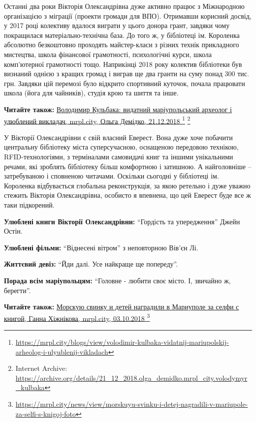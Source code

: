
Останні два роки Вікторія Олександрівна дуже активно працює з Міжнародною
організацією з міграції (проекти громади для ВПО). Отримавши корисний досвід, у
2017 році колективу вдалося виграти у цього донора грант, завдяки чому
покращилася матеріально-технічна база. До того ж, у бібліотеці ім. Короленка
абсолютно безкоштовно проходять майстер-класи з різних технік прикладного
мистецтва, школа фінансової грамотності, психологічні курси, школа комп'ютерної
грамотності тощо. Наприкінці 2018 року колектив бібліотеки був визнаний однією
з кращих громад і виграв ще два гранти на суму понад 300 тис. грн. Завдяки цій
перемозі було відкрито спортивний куточок, почала працювати школа (йога для
чайників), студія крою та шиття та інше.

\medskip
\begin{minipage}{0.95\textwidth}
\textbf{Читайте також:} \href{https://mrpl.city/blogs/view/volodimir-kulbaka-vidatnij-mariupolskij-arheolog-i-ulyublenij-vikladach}{%
Володимир Кульбака: видатний маріупольський археолог і улюблений викладач, %
mrpl.city, Ольга Демідко, 21.12.2018%
} 
\footnote{\url{https://mrpl.city/blogs/view/volodimir-kulbaka-vidatnij-mariupolskij-arheolog-i-ulyublenij-vikladach}} %
\footnote{Internet Archive: \url{https://archive.org/details/21_12_2018.olga_demidko.mrpl_city.volodymyr_kulbaka}}
\end{minipage}
\medskip

У Вікторії Олександрівни є свій власний Еверест. Вона дуже хоче побачити
центральну бібліотеку міста суперсучасною, оснащеною передовою технікою,
RFID-технологіями, з терміналами самовидачі книг та іншими унікальними речами,
які зроблять бібліотеку більш комфортною і затишною. А найголовніше
– затребуваною і сповненою читачами. Оскільки сьогодні у бібліотеці ім.
Короленка відбувається глобальна реконструкція, за якою ретельно і дуже уважно
стежить Вікторія Олександрівна, особисто я впевнена, що цей Еверест буде все ж
таки підкорений.

\textbf{Улюблені книги Вікторії Олександрівни:} \enquote{Гордість та упередження} Джейн Остін.

\textbf{Улюблені фільми:} \enquote{Віднесені вітром} з неповторною Вів'єн Лі.

\textbf{Життєвий девіз:} \enquote{Йди далі. Усе найкраще ще попереду}.

\textbf{Порада всім маріупольцям:} \enquote{Головне - любити своє місто. І, звичайно ж, берегти}.

\textbf{Читайте також:} \href{https://mrpl.city/news/view/morskuyu-svinku-i-detej-nagradili-v-mariupole-za-selfi-s-knigoj-foto}{%
Морскую свинку и детей наградили в Мариуполе за селфи с книгой, %
Ганна Хіжнікова, mrpl.city, 03.10.2018%
}%
\footnote{\url{https://mrpl.city/news/view/morskuyu-svinku-i-detej-nagradili-v-mariupole-za-selfi-s-knigoj-foto}}
